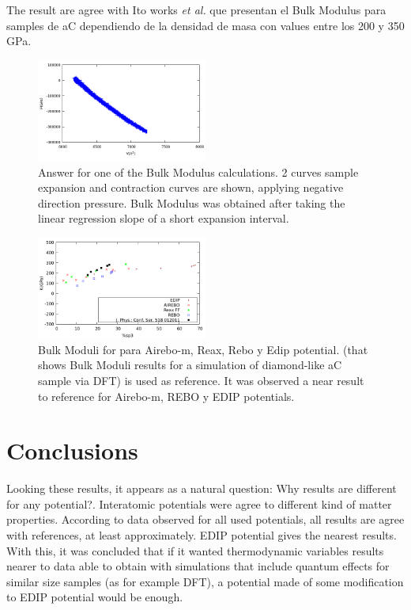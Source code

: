 \documentclass[a4paper,fleqn]{cas-dc}
\begin{document}
The result are agree with Ito works {\it et al.} que presentan el Bulk Modulus para samples de aC dependiendo de la densidad de masa con values entre los 200 y 350 GPa.~\cite{RefBulk}
    \begin{figure}
        \includegraphics[width=0.5\textwidth]{bulk.png}
        \caption{Answer for one of the Bulk Modulus calculations. 2 curves sample expansion and contraction curves are shown, applying negative direction pressure. Bulk Modulus was obtained after taking the linear regression slope of a short expansion interval.}
        \label{fig:bulkproc}
    \end{figure}
    \begin{figure}
        \includegraphics[width=0.5\textwidth]{databulk.png}
        \caption{Bulk Moduli for para Airebo-m, Reax, Rebo y Edip potential.  \cite{RefBulk} (that shows Bulk Moduli results for a simulation of diamond-like aC sample via DFT) is used as reference. It was observed a near result to reference for Airebo-m, REBO y EDIP potentials.}
        \label{fig:bulkdata}
    \end{figure}
\section{Conclusions}
Looking these results, it appears as a natural question: Why results are different for any potential?. Interatomic potentials were agree to different kind of matter properties. According to data observed for all used potentials, all results are agree with references, at least approximately. EDIP potential gives the nearest results. With this, it was concluded that if it wanted thermodynamic variables results nearer to data able to obtain with simulations that include quantum effects for  similar size samples (as for example DFT), a potential made of some modification to EDIP potential would be enough.
\end{document}
